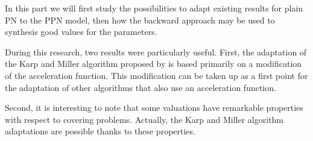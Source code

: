 In this part we will first study the possibilities to adapt existing results for plain \ac{PN} to the \ac{PPN} model, then how the backward approach may be used to synthesis good values for the parameters.

During this research, two results were particularly useful.
First, the adaptation of the Karp and Miller algorithm proposed by \cite{David17} is based primarily on a modification of the acceleration function. This modification can be taken up as a first point for the adaptation of other algorithms that also use an acceleration function. %

Second, it is interesting to note that some valuations have remarkable properties with respect to covering problems.
Actually, the Karp and Miller algorithm adaptations are possible thanks to these properties.

